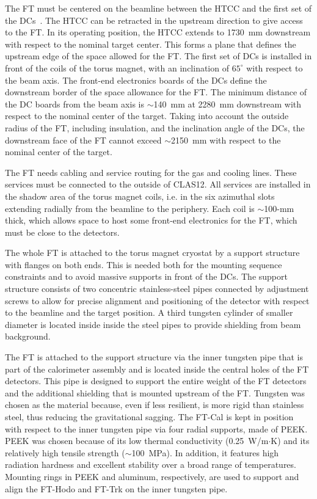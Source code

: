 The FT must be centered on the beamline between the HTCC and the first set of the DCs~\cite{dc}. The HTCC
can be retracted in the upstream direction to give access to the FT. In its operating position, the HTCC extends to
1730~mm downstream with respect to the nominal target center. This forms a plane that defines the upstream edge
of the space allowed for the FT. The first set of DCs is installed in front of the coils of the torus magnet, with an
inclination of $65^\circ$ with respect to the beam axis. The front-end electronics boards of the DCs define the
downstream border of the space allowance for the FT. The minimum distance of the DC boards from the beam axis
is $\sim$140~mm at 2280~mm downstream with respect to the nominal center of the target. Taking into account the
outside radius of the FT, including insulation, and the inclination angle of the DCs, the downstream face of the FT
cannot exceed $\sim$2150~mm with respect to the nominal center of the target.

The FT needs cabling and service routing for the gas and cooling lines. These services must be connected to the
outside of CLAS12. All services are installed in the shadow area of the torus magnet coils, i.e. in the six azimuthal
slots extending radially from the beamline to the periphery. Each coil is $\sim$100-mm thick, which allows space
to host some front-end electronics for the FT, which must be close to the detectors.

The whole FT is attached to the torus magnet cryostat by a support structure with flanges on both ends. This is
needed both for the mounting sequence constraints and to avoid massive supports in front of the DCs. The support
structure consists of two concentric stainless-steel pipes connected by adjustment screws to allow for precise
alignment and positioning of the detector with respect to the beamline and the target position. A third tungsten
cylinder of smaller diameter is located inside inside the steel pipes to provide shielding from beam background. 

The FT is attached to the support structure via the inner tungsten pipe that is part of the calorimeter assembly
and is located inside the central holes of the FT detectors. This pipe is designed to support the entire weight of the
FT detectors and the additional shielding that is mounted upstream of the FT. Tungsten was chosen as the material
because, even if less resilient, is more rigid than stainless steel, thus reducing the gravitational sagging. The FT-Cal
is kept in position with respect to the inner tungsten pipe via four radial supports, made of PEEK. PEEK was chosen
because of its low thermal conductivity (0.25~W/m$\cdot$K) and its relatively high tensile strength
($\sim$100~MPa). In addition, it features high radiation hardness and excellent stability over a broad range of
temperatures. Mounting rings in PEEK and aluminum, respectively, are used to support and align the FT-Hodo and
FT-Trk on the inner tungsten pipe.

